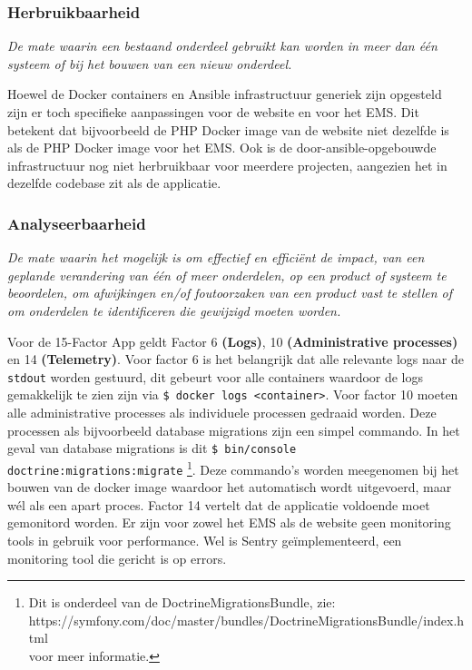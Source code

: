 \subsubsection{Herbruikbaarheid}
\textit{De mate waarin een bestaand onderdeel gebruikt kan worden in meer dan één systeem of bij het bouwen van een nieuw onderdeel.}

Hoewel de Docker containers en Ansible infrastructuur generiek zijn opgesteld zijn er toch specifieke aanpassingen voor de website en voor het EMS. Dit betekent dat bijvoorbeeld de PHP Docker image van de website niet dezelfde is als de PHP Docker image voor het EMS. Ook is de door-ansible-opgebouwde infrastructuur nog niet herbruikbaar voor meerdere projecten, aangezien het in dezelfde codebase zit als de applicatie.

\subsubsection{Analyseerbaarheid}
\textit{De mate waarin het mogelijk is om effectief en efficiënt de impact, van een geplande verandering van één of meer onderdelen, op een product of systeem te beoordelen, om afwijkingen en/of foutoorzaken van een product vast te stellen of om onderdelen te identificeren die gewijzigd moeten worden.}

Voor de 15-Factor App geldt Factor 6 \textbf{(Logs)}, 10 \textbf{(Administrative processes)} en 14 \textbf{(Telemetry)}. Voor factor 6 is het belangrijk dat alle relevante logs naar de \texttt{stdout} worden gestuurd, dit gebeurt voor alle containers waardoor de logs gemakkelijk te zien zijn via \texttt{\$ docker logs <container>}. Voor factor 10 moeten alle administrative processes als individuele processen gedraaid worden. Deze processen als bijvoorbeeld database migrations zijn een simpel commando. In het geval van database migrations is dit \texttt{\$ bin/console doctrine:migrations:migrate} \footnote{Dit is onderdeel van de DoctrineMigrationsBundle, zie:\\ https://symfony.com/doc/master/bundles/DoctrineMigrationsBundle/index.html\\voor meer informatie.}. Deze commando's worden meegenomen bij het bouwen van de docker image waardoor het automatisch wordt uitgevoerd, maar wél als een apart proces. Factor 14 vertelt dat de applicatie voldoende moet gemonitord worden. Er zijn voor zowel het EMS als de website geen monitoring tools in gebruik voor performance. Wel is Sentry geïmplementeerd, een monitoring tool die gericht is op errors.

